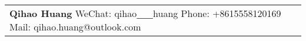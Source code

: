 \newcommand{\myheader}{
\begin{tabular*}{\textwidth}{l@{\extracolsep{\fill}}r}
  \specialrule{0em}{4pt}{4pt}
  \textbf{Qihao Huang} \quad WeChat: qihao\textbf{\_}\textbf{\_}huang \quad Phone: +8615558120169 \quad Mail: qihao.huang@outlook.com  \\ 
  \end{tabular*}\\\vspace{0.1in}
  
  \vspace{0.1in}
}

\myheader


